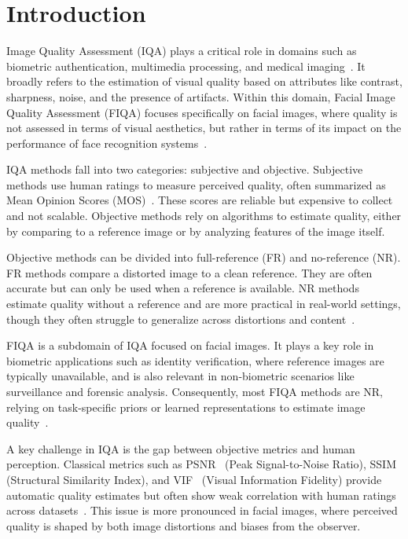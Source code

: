 \section{Introduction}

Image Quality Assessment (IQA) plays a critical role in domains such as biometric authentication, multimedia processing, and medical imaging~\cite{kim2015facerecon, huang2020facerecon}. It broadly refers to the estimation of visual quality based on attributes like contrast, sharpness, noise, and the presence of artifacts. Within this domain, Facial Image Quality Assessment (FIQA) focuses specifically on facial images, where quality is not assessed in terms of visual aesthetics, but rather in terms of its impact on the performance of face recognition systems~\cite{cavazos2020racebias, terhorst2020demobias}.

IQA methods fall into two categories: subjective and objective. Subjective methods use human ratings to measure perceived quality, often summarized as Mean Opinion Scores (MOS)~\cite{ITU-R-BT500}. These scores are reliable but expensive to collect and not scalable. Objective methods rely on algorithms to estimate quality, either by comparing to a reference image or by analyzing features of the image itself.

Objective methods can be divided into full-reference (FR) and no-reference (NR). FR methods compare a distorted image to a clean reference. They are often accurate but can only be used when a reference is available. NR methods estimate quality without a reference and are more practical in real-world settings, though they often struggle to generalize across distortions and content~\cite{shahrukh2019survey}.

FIQA is a subdomain of IQA focused on facial images. It plays a key role in biometric applications such as identity verification, where reference images are typically unavailable, and is also relevant in non-biometric scenarios like surveillance and forensic analysis. Consequently, most FIQA methods are NR, relying on task-specific priors or learned representations to estimate image quality~\cite{hernandez2019faceqnet}.

A key challenge in IQA is the gap between objective metrics and human perception. Classical metrics such as PSNR~\cite{gonzalez2002digital} (Peak Signal-to-Noise Ratio), SSIM~\cite{wang2004ssim} (Structural Similarity Index), and VIF~\cite{sheikh2006image} (Visual Information Fidelity) provide automatic quality estimates but often show weak correlation with human ratings across datasets~\cite{shahrukh2019survey}. This issue is more pronounced in facial images, where perceived quality is shaped by both image distortions and biases from the observer.

